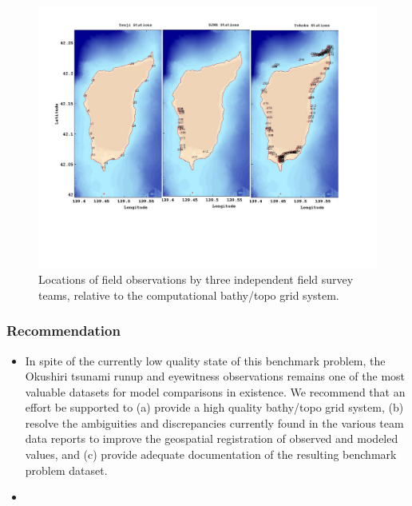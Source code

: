 \begin{figure}[ht]
\hfil\includegraphics[width=5.0in]{bp9/TeamStations.pdf}\hfil
\caption{\label{TeamStations}
Locations of field observations by three independent field survey teams, relative to the computational bathy/topo grid system. 
  }
\end{figure}

\subsubsection{Recommendation}
\begin{itemize}
\item In spite of the currently low quality state of this benchmark problem, the Okushiri tsunami runup and eyewitness observations remains one of the most valuable datasets for model comparisons in existence.  We recommend that an effort be supported to (a) provide a high quality bathy/topo grid system, (b) resolve the ambiguities and discrepancies currently found in the various team data reports to improve the geospatial registration of observed and modeled values, and (c) provide adequate documentation of the resulting benchmark problem dataset.
\end{itemize}



\begin{itemize}
\item 
\end{itemize}
